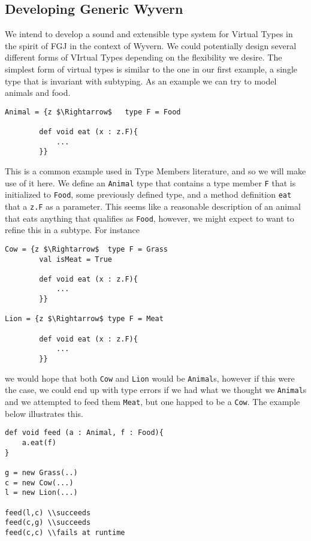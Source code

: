 \documentclass[11pt
              , a4paper
              , twoside
              , openright
              ]{report}
\numberwithin{case}{theorem}
\numberwithin{subcase}{case}
\begin{document}
\subsection{Developing Generic Wyvern}

We intend to develop a sound and extensible type system for Virtual Types in the spirit of FGJ in the context of Wyvern. We could potentially design several different forms of VIrtual Types depending on the flexibility we desire. The simplest form of virtual types is similar to the one in our first example, a single type that is invariant with subtyping. As an example we can try to model animals and food. 
\begin{lstlisting}[mathescape, style=custom_lang]
Animal = {z $\Rightarrow$	type F = Food
		
		def void eat (x : z.F){
			...
		}}
\end{lstlisting}
This is a common example used in Type Members literature, and so we will make use of it here. We define an \verb|Animal| type that contains a type member \verb|F| that is initialized to \verb|Food|, some previously defined type, and a method definition \verb|eat| that a \verb|z.F| as a parameter. This seems like a reasonable description of an animal that eats anything that qualifies as \verb|Food|, however, we might expect to want to refine this in a subtype. For instance
\begin{lstlisting}[mathescape, style=custom_lang]
Cow = {z $\Rightarrow$	type F = Grass
		val isMeat = True
		
		def void eat (x : z.F){
			...
		}}

Lion = {z $\Rightarrow$	type F = Meat
		
		def void eat (x : z.F){
			...
		}}
\end{lstlisting}
we would hope that both \verb|Cow| and \verb|Lion| would be \verb|Animal|s, however if this were the case, we could end up with type errors if we had what we thought we \verb|Animal|s and we attempted to feed them \verb|Meat|, but one happed to be a \verb|Cow|. The example below illustrates this.
\begin{lstlisting}[mathescape, style=custom_lang]
def void feed (a : Animal, f : Food){
	a.eat(f)
}

g = new Grass(..)
c = new Cow(...)
l = new Lion(...)

feed(l,c) \\succeeds
feed(c,g) \\succeeds
feed(c,c) \\fails at runtime
\end{lstlisting}
\end{document}
